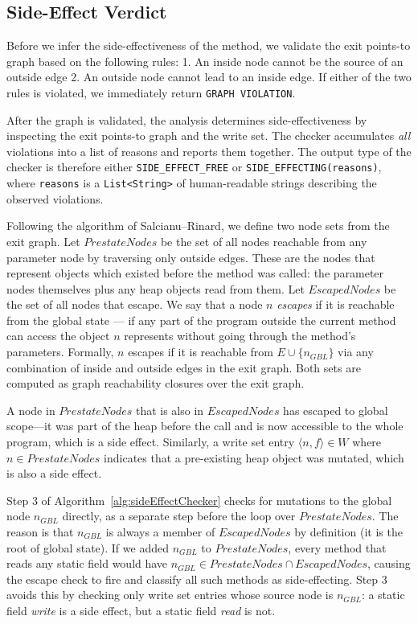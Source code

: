 \subsection{Side-Effect Verdict} \label{sec:side-effect-verdict}
Before we infer the side-effectiveness of the method, we validate the exit points-to graph based on the following rules:
1. An inside node cannot be the source of an outside edge
2. An outside node cannot lead to an inside edge.
If either of the two rules is violated, we immediately return \texttt{GRAPH VIOLATION}.

After the graph is validated, the analysis determines side-effectiveness by inspecting the exit points-to graph and the write set. The checker accumulates \emph{all} violations into a list of reasons and reports them together. The output type of the checker is therefore either \texttt{SIDE\_EFFECT\_FREE} or \texttt{SIDE\_EFFECTING(reasons)}, where \texttt{reasons} is a \texttt{List<String>} of human-readable strings describing the observed violations. 


Following the algorithm of Salcianu--Rinard, we define two node sets from the exit graph. Let $\mathit{PrestateNodes}$ be the set of all nodes reachable from any parameter node by traversing only outside edges. These are the nodes that represent objects which existed before the method was called: the parameter nodes themselves plus any heap objects read from them. Let $\mathit{EscapedNodes}$ be the set of all nodes that escape. We say that a node $n$ \emph{escapes} if it is reachable from the global state --- if any part of the program outside the current method can access the object $n$ represents without going through the method's parameters. Formally, $n$ escapes if it is reachable from $E \cup \{n_{GBL}\}$ via any combination of inside and outside edges in the exit graph. Both sets are computed as graph reachability closures over the exit graph.

A node in $\mathit{PrestateNodes}$ that is also in $\mathit{EscapedNodes}$ has escaped to global scope---it was part of the heap before the call and is now accessible to the whole program, which is a side effect. Similarly, a write set entry $\langle n, f \rangle \in W$ where $n \in \mathit{PrestateNodes}$ indicates that a pre-existing heap object was mutated, which is also a side effect.

Step 3 of Algorithm~\ref{alg:sideEffectChecker} checks for mutations to the global node $n_{GBL}$ directly, as a separate step before the loop over $\mathit{PrestateNodes}$. The reason is that $n_{GBL}$ is always a member of $\mathit{EscapedNodes}$ by definition (it is the root of global state). If we added $n_{GBL}$ to $\mathit{PrestateNodes}$, every method that reads any static field would have $n_{GBL} \in \mathit{PrestateNodes} \cap \mathit{EscapedNodes}$, causing the escape check to fire and classify all such methods as side-effecting. Step 3 avoids this by checking only write set entries whose source node is $n_{GBL}$: a static field \emph{write} is a side effect, but a static field \emph{read} is not.

